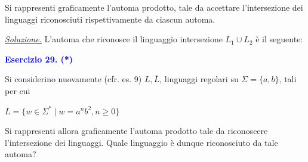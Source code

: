 \documentclass[a4paper,10pt]{article}
\begin{document}
{\begin{itemize}[label=, leftmargin=0pt]
{{\begin{center}
\begin{tikzpicture}[shorten >=1pt, node distance=2cm, on grid, auto]
    \end{tikzpicture}
    \end{center}
    }
    Si rappresenti graficamente l'automa prodotto, tale da accettare l'intersezione dei linguaggi riconosciuti rispettivamente da ciascun automa.

    \begin{osservazioni}
        \underline{\textit{Soluzione.}}
        L'automa che riconosce il linguaggio intersezione $L_1\cup L_2$ è il seguente:
        {
    \small
    \begin{center}
    \end{center}
    }
    \end{osservazioni}

    \textcolor{blue}{\item \textbf{Esercizio 29. (*)} \\ }
    Si considerino nuovamente (cfr. es. 9) $L, \overline{L}$, linguaggi regolari su $\Sigma =\{a,b\}$, tali per cui
    {
    \begin{center}
    $L = \{ w \in \Sigma^* \mid w = a^nb^2, n\geq 0\}$\\
    \end{center}
    }
    Si rappresenti allora graficamente l'automa prodotto tale da riconoscere l'intersezione dei linguaggi. Quale linguaggio è dunque riconosciuto da tale automa?

}
\end{itemize}
}
\vfill
\noindent\makebox[\linewidth]{\rule{\linewidth}{0.1pt}}
\end{document}
